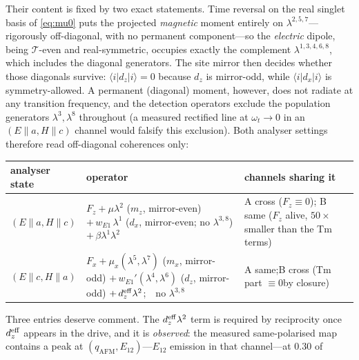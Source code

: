 \documentclass[11pt,a4paper]{article}
\newcommand{\ket}[1]{|#1\rangle}
\newcommand{\bra}[1]{\langle #1|}
\newcommand{\qafm}{q_{\mathrm{AFM}}}
\begin{document}
Their content is fixed by two exact statements.  Time reversal on the
real singlet basis of \cref{eq:mu0} puts the projected \emph{magnetic}
moment entirely on $\lambda^{2,5,7}$---rigorously off-diagonal, with no
permanent component---so the \emph{electric} dipole, being
$\mathcal T$-even and real-symmetric, occupies exactly the complement
$\lambda^{1,3,4,6,8}$, which includes the diagonal generators.  The site
mirror then decides whether those diagonals survive: $\bra id_z\ket i=0$
because $d_z$ is mirror-odd, while $\bra id_x\ket i$ is symmetry-allowed.
A permanent (diagonal) moment, however, does not radiate at any
transition frequency, and the detection operators exclude the population
generators $\lambda^{3},\lambda^8$ throughout (a measured rectified line
at $\omega_t\!\to\!0$ in an $(E\!\parallel\!a,H\!\parallel\!c)$ channel
would falsify this exclusion).  Both analyser settings therefore read
off-diagonal coherences only:
\begin{center}\small
\renewcommand{\arraystretch}{1.3}
\begin{tabular}{lll}
\toprule
analyser state & operator & channels sharing it\\
\midrule
$(E\!\parallel\!a,H\!\parallel\!c)$ &
  $F_z+\mu\lambda^2$ ($m_z$, mirror-even)\newline
  $+\,w_{E1}\,\lambda^1$ ($d_x$, mirror-even; no $\lambda^{3,8}$)\newline
  $+\,\beta\lambda^1\lambda^2$ &
  A cross ($F_z\equiv0$);\newline
  B same ($F_z$ alive, $50\times$\newline smaller than the Tm terms)\\
\midrule
$(E\!\parallel\!c,H\!\parallel\!a)$ &
  $F_x+\mu_x(\lambda^5,\lambda^7)$ ($m_x$, mirror-odd)\newline
  $+\,w_{E1}'(\lambda^4,\lambda^6)$ ($d_z$, mirror-odd)\newline
  $+\,d_z^{\rm eff}\lambda^2$;\ \ no $\lambda^{3,8}$ &
  A same;\newline B cross (Tm part $\equiv0$\newline by closure)\\
\bottomrule
\end{tabular}
\end{center}
Three entries deserve comment.  The $d_z^{\rm eff}\lambda^2$ term is
required by reciprocity once $d_z^{\rm eff}$ appears in the drive, and
it is \emph{observed}: the measured same-polarised map contains a peak
at $(\qafm,E_{12})$---$E_{12}$ emission in that channel---at $0.30$ of
\end{document}
